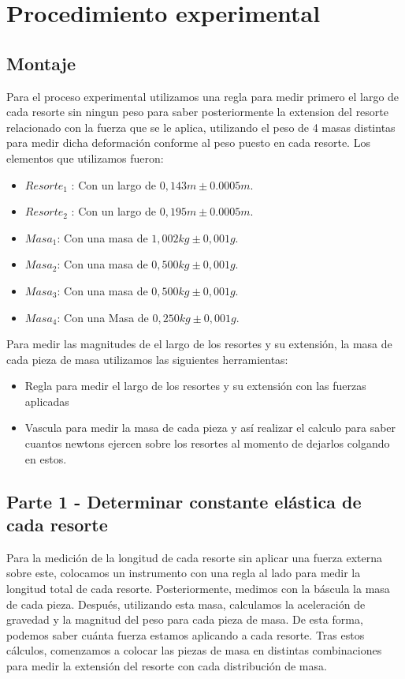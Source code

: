 \documentclass[12pt,a4paper]{article}
\begin{document}
\section{Procedimiento experimental}

\subsection{Montaje} \label{Montaje}

Para el proceso experimental utilizamos una regla para medir primero el largo de cada resorte sin ningun peso para saber posteriormente la extension del resorte relacionado con la fuerza que se le aplica, utilizando el peso de 4 masas distintas para medir dicha deformación conforme al peso puesto en cada resorte.
Los elementos que utilizamos fueron:
\begin{itemize}
    \item $Resorte_1$ : Con un largo de $0,143m \pm  {0.0005}m$.
    \item $Resorte_2$ : Con un largo de $0,195m \pm  {0.0005}m$.
    \item $Masa_1$: Con una masa de $1,002 kg \pm {0,001}g$.
    \item $Masa_2$: Con una masa de $0,500 kg \pm {0,001} g$.
    \item $Masa_3$: Con una masa de $0,500 kg \pm {0,001} g$.
    \item $Masa_4$: Con una Masa de $0,250 kg \pm {0,001} g$.
\end{itemize}

Para medir las magnitudes de el largo de los resortes y su extensión, la masa de cada pieza de masa utilizamos las siguientes herramientas:
\begin{itemize}
    \item Regla para medir el largo de los resortes y su extensión con las fuerzas aplicadas
    \item Vascula para medir la masa de cada pieza y así realizar el calculo para saber cuantos newtons ejercen sobre los resortes al momento de dejarlos colgando en estos.
\end{itemize}

\subsection{Parte 1 - Determinar constante elástica de cada resorte} \label{Procedimiento-Parte-1}

Para la medición de la longitud de cada resorte sin aplicar una fuerza externa sobre este, colocamos un instrumento con una regla al lado para medir la longitud total de cada resorte. Posteriormente, medimos con la báscula la masa de cada pieza. Después, utilizando esta masa, calculamos la aceleración de gravedad y la magnitud del peso para cada pieza de masa. De esta forma, podemos saber cuánta fuerza estamos aplicando a cada resorte. Tras estos cálculos, comenzamos a colocar las piezas de masa en distintas combinaciones para medir la extensión del resorte con cada distribución de masa.
\end{document}
